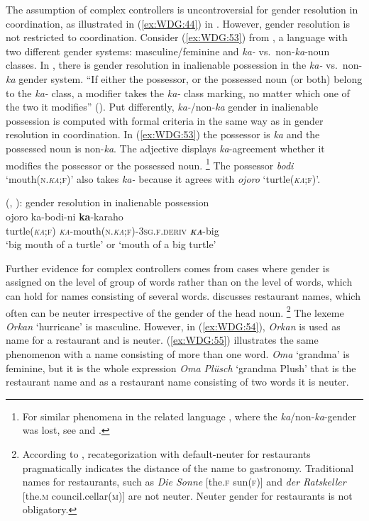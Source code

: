 \documentclass[output=collectionpaper]{langsci/langscibook}
\begin{document}
The assumption of complex controllers is uncontroversial for gender resolution in coordination, as illustrated in (\ref{ex:WDG:44}) in . However, gender resolution is not restricted to coordination. Consider (\ref{ex:WDG:53}) from , a language with two different gender systems: masculine/feminine and \textit{ka-} vs.\ non-\textit{ka}-noun classes. In , there is gender resolution in inalienable possession in the \textit{ka-} vs.\ non-\textit{ka} gender system. ``If either the possessor, or the possessed noun (or both) belong to the \textit{ka-} class, a modifier takes the \textit{ka-} class marking, no matter which one of the two it modifies'' (\citealt[240]{Aikhenvald2010}). Put differently, \textit{ka-}/non-\textit{ka} gender in  inalienable possession is computed with formal criteria in the same way as in gender resolution in coordination. In (\ref{ex:WDG:53}) the possessor is \textit{ka} and the possessed noun is non-\textit{ka}. The adjective displays \textit{ka}-agreement whether it modifies the possessor or the possessed noun.%
\footnote{%
For similar phenomena in the related language , where the \textit{ka}/non-\textit{ka}-gender was lost, see \cite{Dixon2000} and .
} %
The possessor \textit{bodi} `mouth(\textsc{n.\textit{ka};f})' also takes \textit{ka-} because it agrees with \textit{ojoro} `turtle(\textsc{\textit{ka};f})'.

\ea\label{ex:WDG:53}
 (, \citealt[240]{Aikhenvald2010}): gender resolution in inalienable possession\\
\gll	ojoro	ka-bodi-ni	\textbf{ka}-karaho\\
	turtle(\textsc{\textit{ka};f})	\textsc{\textit{ka}}-mouth(\textsc{n.\textit{ka};f})-\textsc{3sg.f.deriv}	\textbf{\textit{\textsc{ka}}}-big\\
\glt `big mouth of a turtle' or `mouth of a big turtle'\\
\z

Further evidence for complex controllers comes from cases where gender is assigned on the level of group of words rather than on the level of words, which can hold for names consisting of several words. \cite{Plank2015} discusses  restaurant names, which often can be neuter irrespective of the gender of the head noun.%
\footnote{%
According to \cite{Plank2015}, recategorization with default-neuter for  restaurants pragmatically indicates the distance of the name to gastronomy. Traditional names for restaurants, such as \textit{Die Sonne} [the.\textsc{f} sun(\textsc{f})] and \textit{der Ratskeller} [the.\textsc{m} council.cellar(\textsc{m})] are not neuter. Neuter gender for  restaurants is not obligatory.
} %
The  lexeme \textit{Orkan} `hurricane' is masculine. However, in (\ref{ex:WDG:54}), \textit{Orkan} is used as name for a restaurant and is neuter. (\ref{ex:WDG:55}) illustrates the same phenomenon with a name consisting of more than one word. \textit{Oma} `grandma' is feminine, but it is the whole expression \textit{Oma Plüsch} `grandma Plush' that is the restaurant name and as a restaurant name consisting of two words it is neuter.
\end{document}
